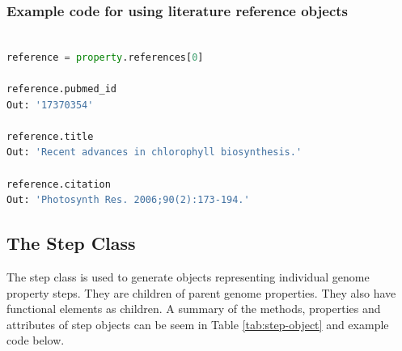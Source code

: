 \subsubsection{Example code for using literature reference objects}

\begin{lstlisting}[language=Python]

reference = property.references[0]
	
reference.pubmed_id
Out: '17370354'

reference.title
Out: 'Recent advances in chlorophyll biosynthesis.'

reference.citation
Out: 'Photosynth Res. 2006;90(2):173-194.'

\end{lstlisting}

\subsection{The Step Class}

The step class is used to generate objects representing individual genome property steps. They are children of parent genome properties. They also have functional elements as children. A summary of the methods, properties and attributes of step objects can be seem in Table \ref{tab:step-object} and example code below.

